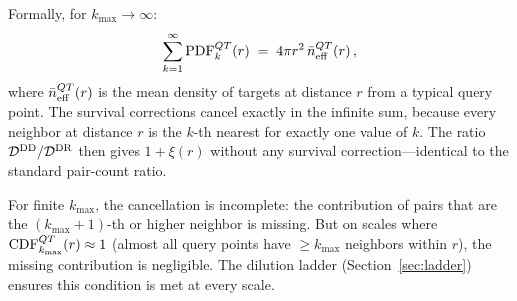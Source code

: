 Formally, for $k_{\max} \to \infty$:
\begin{equation}
  \sum_{k=1}^{\infty} \mathrm{PDF}^{QT}_k(r) \;=\; 4\pi r^2\,\bar{n}^{QT}_{\rm eff}(r)\,,
  \label{eq:sum_pdf}
\end{equation}
where $\bar{n}^{QT}_{\rm eff}(r)$ is the mean density of targets at distance $r$ from a typical query point.  The survival corrections cancel exactly in the infinite sum, because every neighbor at distance $r$ is the $k$-th nearest for exactly one value of $k$.  The ratio $\mathcal{D}^{\mathrm{DD}}/\mathcal{D}^{\mathrm{DR}}$ then gives $1 + \xi(r)$ without any survival correction---identical to the standard pair-count ratio.

For finite $k_{\max}$, the cancellation is incomplete: the contribution of pairs that are the $(k_{\max}+1)$-th or higher neighbor is missing.  But on scales where $\mathrm{CDF}^{QT}_{k_{\max}}(r) \approx 1$ (almost all query points have $\geq k_{\max}$ neighbors within $r$), the missing contribution is negligible.  The dilution ladder (Section~\ref{sec:ladder}) ensures this condition is met at every scale.
